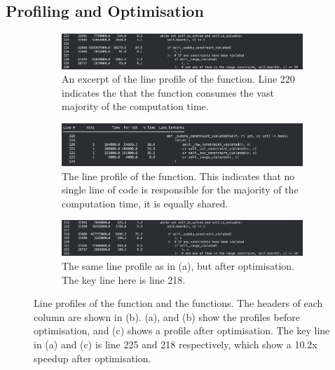     \subsection{Profiling and Optimisation}\label{subsec:profiling-and-optimisation}
    \begin{figure}[htb]
    \centering
    \begin{subfigure}[b]{0.9\linewidth}
        \includegraphics[width=\linewidth]{figures/line_profile1}
        \caption{An excerpt of the line profile of the  function. Line 220 indicates
        the that the  function consumes the vast majority of the
        computation time.}
        \label{fig:line_profile1}
    \end{subfigure}
    \hfill
    \begin{subfigure}[b]{0.9\linewidth}
        \includegraphics[width=\linewidth]{figures/line_profile2}
        \caption{The line profile of the  function. This indicates
        that no single line of code is responsible for the majority of the computation time, it is equally shared.}
        \label{fig:line_profile2}
    \end{subfigure}
    \hfill
    \begin{subfigure}[b]{0.9\linewidth}
        \includegraphics[width=\linewidth]{figures/line_profile3}
        \caption{The same line profile as in (a), but after optimisation. The key line here is line 218.}
        \label{fig:line_profile3}
    \end{subfigure}
    \caption{Line profiles of the  function and the
     functions. The headers of each column are shown in (b).
        (a), and (b) show the profiles before optimisation, and (c) shows a profile after optimisation.
        The key line in (a) and (c) is line 225 and 218 respectively, which show a 10.2x speedup after optimisation.}
    \label{fig:line_profile}
    \hfill
    \end{figure}
